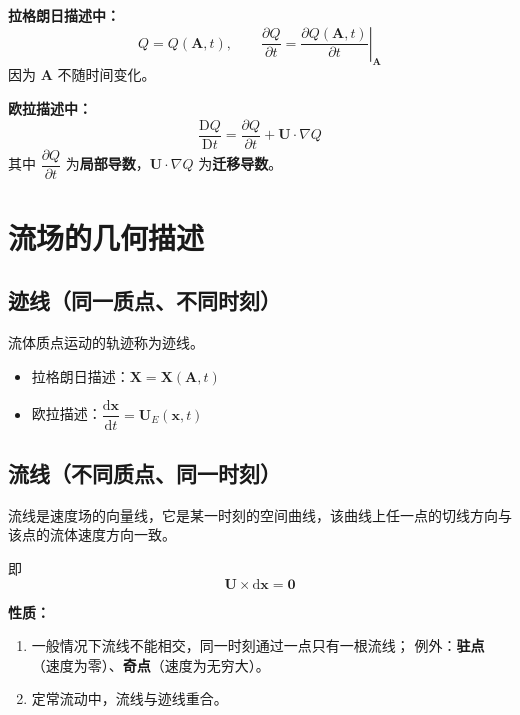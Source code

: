 \textbf{拉格朗日描述中：}
\[
Q=Q(\boldsymbol{A},t),\qquad
\frac{\partial Q}{\partial t}=\left.\frac{\partial Q(\boldsymbol{A},t)}{\partial t}\right|_{\boldsymbol{A}}
\]
因为 $\boldsymbol{A}$ 不随时间变化。

\textbf{欧拉描述中：}
\[
\frac{\mathrm{D}Q}{\mathrm{D}t}=\frac{\partial Q}{\partial t}+\boldsymbol{U}\cdot\nabla Q
\]
其中 $\dfrac{\partial Q}{\partial t}$ 为\textbf{局部导数}，$\boldsymbol{U}\cdot\nabla Q$ 为\textbf{迁移导数}。

\section{流场的几何描述}

\subsection{迹线（同一质点、不同时刻）}

\begin{definition}[迹线]
	流体质点运动的轨迹称为迹线。
\end{definition}

\begin{itemize}
	\item 拉格朗日描述：$\boldsymbol{X}=\boldsymbol{X}(\boldsymbol{A},t)$
	\item 欧拉描述：$\dfrac{\mathrm{d}\boldsymbol{x}}{\mathrm{d}t}=\boldsymbol{U}_{E}(\boldsymbol{x},t)$
\end{itemize}

\subsection{流线（不同质点、同一时刻）}

\begin{definition}[流线]
	流线是速度场的向量线，它是某一时刻的空间曲线，该曲线上任一点的切线方向与该点的流体速度方向一致。
\end{definition}

即
\[
\boldsymbol{U}\times\mathrm{d}\boldsymbol{x}=\boldsymbol{0}
\]

\textbf{性质：}

\begin{enumerate}
	\item 一般情况下流线不能相交，同一时刻通过一点只有一根流线；
	      例外：\textbf{驻点}（速度为零）、\textbf{奇点}（速度为无穷大）。
	\item 定常流动中，流线与迹线重合。
\end{enumerate}

